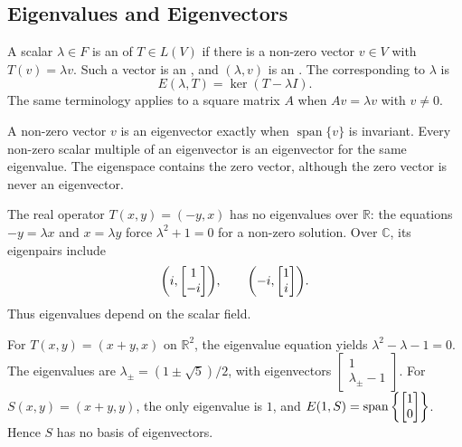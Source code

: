 \subsection{Eigenvalues and Eigenvectors}

\begin{Definition}
A scalar $\lambda\in F$ is an  of $T\in L(V)$ if there is a non-zero vector $v\in V$ with $T(v)=\lambda v$. Such a vector is an , and $(\lambda,v)$ is an . The  corresponding to $\lambda$ is
\begin{equation*}
E(\lambda,T)=\ker(T-\lambda I).
\end{equation*}
The same terminology applies to a square matrix $A$ when $Av=\lambda v$ with $v\ne0$.
\end{Definition}

A non-zero vector $v$ is an eigenvector exactly when $\operatorname{span}\{v\}$ is invariant. Every non-zero scalar multiple of an eigenvector is an eigenvector for the same eigenvalue. The eigenspace contains the zero vector, although the zero vector is never an eigenvector.

\begin{Example}
The real operator $T(x,y)=(-y,x)$ has no eigenvalues over $\mathbb R$: the equations $-y=\lambda x$ and $x=\lambda y$ force $\lambda^2+1=0$ for a non-zero solution. Over $\mathbb C$, its eigenpairs include
\begin{equation*}
\pqty{i,\begin{bmatrix}1\\-i\end{bmatrix}},\qquad \pqty{-i,\begin{bmatrix}1\\i\end{bmatrix}}.
\end{equation*}
Thus eigenvalues depend on the scalar field.
\end{Example}

\begin{Example}
For $T(x,y)=(x+y,x)$ on $\mathbb R^2$, the eigenvalue equation yields $\lambda^2-\lambda-1=0$. The eigenvalues are $\lambda_\pm=(1\pm\sqrt5)/2$, with eigenvectors $\begin{bmatrix}1\\\lambda_\pm-1\end{bmatrix}$. For $S(x,y)=(x+y,y)$, the only eigenvalue is $1$, and $E(1,S)=\operatorname{span}\qty{\begin{bmatrix}1\\0\end{bmatrix}}$. Hence $S$ has no basis of eigenvectors.
\end{Example}

